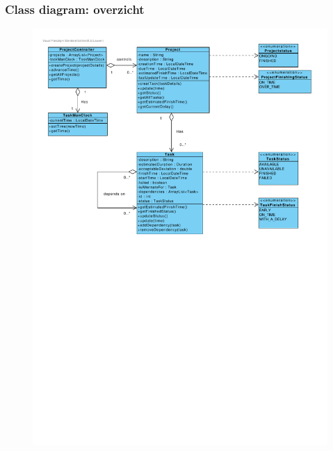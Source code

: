 \documentclass{beamer}
\begin{document}
%
%
%

\begin{frame}
\frametitle {Class diagram: overzicht}
\vspace{-1.4cm}
\begin{figure}
\centering
\begin{center}
\includegraphics[width=1.05\textwidth]{figures/ClassDiagram.pdf}
\end{center}

\end{figure}
\end{frame}
\end{document}
